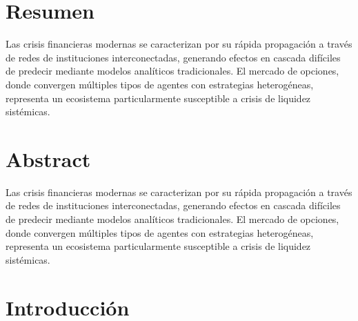 \section*{Resumen}


Las crisis financieras modernas se caracterizan por su rápida propagación a través de redes de instituciones interconectadas, generando efectos en cascada difíciles de predecir mediante modelos analíticos tradicionales. El mercado de opciones, donde convergen múltiples tipos de agentes con estrategias heterogéneas, representa un ecosistema particularmente susceptible a crisis de liquidez sistémicas.

\section*{Abstract}


Las crisis financieras modernas se caracterizan por su rápida propagación a través de redes de instituciones interconectadas, generando efectos en cascada difíciles de predecir mediante modelos analíticos tradicionales. El mercado de opciones, donde convergen múltiples tipos de agentes con estrategias heterogéneas, representa un ecosistema particularmente susceptible a crisis de liquidez sistémicas.




\section{Introducción}
\setcounter{page}{1}
